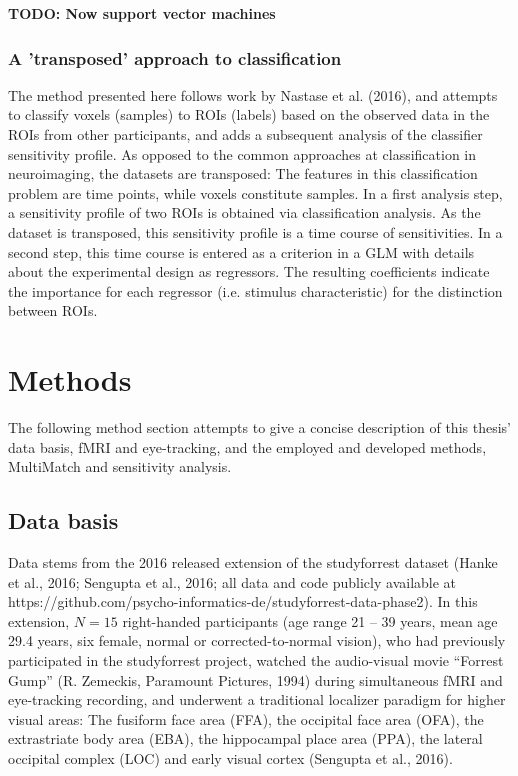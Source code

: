 \documentclass[a4paper, 12pt]{scrreprt}
\begin{document}
\textbf{TODO: Now support vector machines}


\subsection{A 'transposed' approach to classification}
The method presented here follows work by Nastase et al. (2016), and attempts to classify  voxels (samples) to ROIs (labels) based on the observed data in the ROIs from other participants, and adds a subsequent analysis of the classifier sensitivity profile. As opposed to the common approaches at classification in neuroimaging, the datasets are transposed: The features in this classification problem are time points, while voxels constitute samples. \newline
In a first analysis step, a sensitivity profile of two ROIs is obtained via classification analysis. As the dataset is transposed, this sensitivity profile is a time course of sensitivities. In a second step, this time course is entered as a criterion in a GLM with details about the experimental design as regressors. The resulting coefficients indicate the importance for each regressor (i.e. stimulus characteristic) for the distinction between ROIs.



\chapter{Methods}\label{par:methods}

The following method section attempts to give a concise description of this thesis' data basis, fMRI and eye-tracking, and the employed and developed methods, MultiMatch and sensitivity analysis. 

\section{Data basis}

Data stems from the 2016 released extension of the studyforrest dataset (Hanke et al., 2016; Sengupta et al., 2016; all data and code publicly available at https://github.com/psycho-informatics-de/studyforrest-data-phase2). In this extension, $N = 15$ right-handed participants (age range 21 – 39 years, mean age 29.4 years, six female, normal or corrected-to-normal vision), who had previously participated in the studyforrest project, watched the audio-visual movie “Forrest Gump” (R. Zemeckis, Paramount Pictures, 1994) during simultaneous fMRI and eye-tracking recording, and underwent a traditional localizer paradigm for higher visual areas: The fusiform face area (FFA), the occipital face area (OFA), the extrastriate body area (EBA), the hippocampal place area (PPA), the lateral occipital complex (LOC) and early visual cortex (Sengupta et al., 2016).
\end{document}
